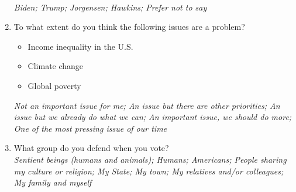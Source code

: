 \begin{enumerate}[resume]
\\ \textit{Biden; Trump; Jorgensen; Hawkins; Prefer not to say}
\item To what extent do you think the following issues are a problem?
\begin{itemize}
    \item Income inequality in the U.S. 
    \item Climate change
    \item Global poverty
\end{itemize}
\textit{Not an important issue for me; An issue but there are other priorities; An issue but we already do what we can; An important issue, we should do more; One of the most pressing issue of our time}
\item What group do you defend when you vote?
\\ \textit{Sentient beings (humans and animals); Humans; Americans; People sharing my culture or religion; My State; My town; My relatives and/or colleagues; My family and myself}
\end{enumerate}

